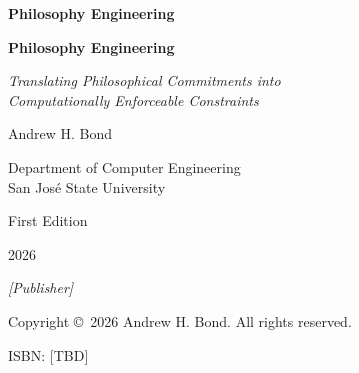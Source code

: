 \documentclass[12pt,letterpaper,twoside,openright]{book}
\theoremstyle{plain}
\theoremstyle{definition}
\theoremstyle{remark}
\begin{document}
\frontmatter

\begin{titlepage}
\vspace*{3cm}
\begin{center}
{\Huge\bfseries Philosophy Engineering}
\end{center}
\vfill
\end{titlepage}

\cleardoublepage

\begin{titlepage}
\centering
\vspace*{2cm}

{\Huge\bfseries Philosophy Engineering\par}
\vspace{0.8cm}
{\Large\itshape Translating Philosophical Commitments into\\Computationally Enforceable Constraints\par}

\vspace{2cm}

{\large Andrew H. Bond\par}
\vspace{0.3cm}
{\normalsize Department of Computer Engineering\\
San Jos\'{e} State University\par}

\vspace{2cm}

{\normalsize First Edition\par}
\vspace{0.3cm}
{\normalsize 2026\par}

\vfill

{\small\textit{[Publisher]}\par}

\end{titlepage}

\cleardoublepage

\thispagestyle{empty}
\vspace*{\fill}
\noindent Copyright \copyright\ 2026 Andrew H. Bond. All rights reserved.

\vspace{1em}
\noindent ISBN: [TBD]
\end{document}
